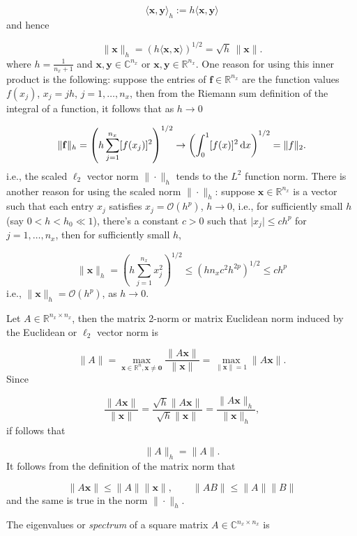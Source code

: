 \documentclass[12pt,landscape]{article}
\begin{document}
{\[
\langle \mathbf{x}, \mathbf{y}\rangle_{h} := h\langle \mathbf{x}, \mathbf{y}\rangle
\]
and hence

\[
\| \mathbf{x} \|_h = \left(h\langle\mathbf{x},\mathbf{x}\rangle\right)^{1/2} = \sqrt{h}\,\| \mathbf{x}\|.
\]
where $h = \frac{1}{n_x+1}$ and $\mathbf{x}, \mathbf{y} \in \mathbb{C}^{n_x}$ or $\mathbf{x}, \mathbf{y} \in \mathbb{R}^{n_x}$.  One reason for using this inner product is the following: suppose the entries of $\mathbf{f} \in \mathbb{R}^{n_x}$ are the function values $f(x_j)$, $x_j = jh$, $j = 1, \ldots, n_x$, then from the Riemann sum definition of the integral of a function, it follows that as $h \to 0$

\[
\| \mathbf{f} \|_h = \left(h\sum_{j=1}^{n_x} [f(x_j)]^2  \right)^{1/2} \to \left( \int_0^1 [f(x)]^2 \,{\rm d}x  \right)^{1/2} = \| f\|_2.
\]
i.e., the scaled $\ell_2$ vector norm $\|\cdot \|_h$ tends to the $L^2$ function norm. There is another reason for using the scaled norm $\|\cdot \|_h$: suppose $\mathbf{x} \in \mathbb{R}^{n_x}$ is a vector such that each entry $x_j$ satisfies $x_j = \mathcal{O}(h^p)$, $h \to 0$, i.e., for sufficiently small $h$ (say $0 < h < h_0\ll 1$), there's a constant $c>0$ such that $\vert x_j \vert \leq c h^p$ for $j = 1, \ldots, n_x$, then for sufficiently small $h$,

\[
\| \mathbf{x} \|_h = \left(h\sum_{j=1}^{n_x} x_j^2  \right)^{1/2} \leq \left(hn_x c^2h^{2p}  \right)^{1/2} \leq ch^p
\]
i.e., $\| \mathbf{x} \|_h = \mathcal{O}(h^p)$, as $h \to 0$.

Let $A \in \mathbb{R}^{n_x \times n_x}$, then the matrix 2-norm or matrix Euclidean norm induced by the Euclidean or $\ell_2$ vector norm is

\[
\| A \| = \max_{\mathbf{x} \in \mathbb{R}^n, \mathbf{x}\neq \mathbf{0}} \frac{\| A\mathbf{x} \|}{\| \mathbf{x}\|} = \max_{\|\mathbf{x}\| =1} \| A\mathbf{x} \|.
\]
Since

\[
\frac{\| A\mathbf{x} \|}{\| \mathbf{x}\|} = \frac{\sqrt{h}\| A\mathbf{x} \|}{\sqrt{h}\| \mathbf{x}\|} =  \frac{\| A\mathbf{x} \|_h}{\| \mathbf{x}\|_h},
\]
if follows that 

\[
\| A \|_h = \| A \|.
\]
It follows from the definition of the matrix norm that

\[
\| A \mathbf{x}\| \leq \| A \| \| \mathbf{x} \|, \qquad \| A B\| \leq \| A\| \|B\|
\]
and the same is true in the norm $\| \cdot \|_h$.

The eigenvalues or \emph{spectrum} of a square matrix $A \in \mathbb{C}^{n_x \times n_x}$ is

}
\end{document}
